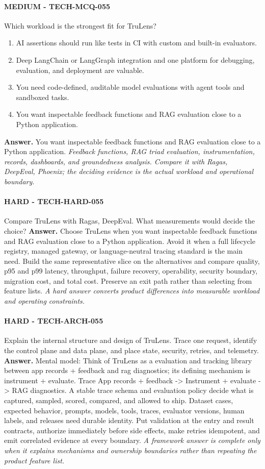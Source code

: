 \paragraph{MEDIUM - TECH-MCQ-055} Which workload is the strongest fit for TruLens?
\begin{enumerate}[label=\Alph*.]
\item AI assertions should run like tests in CI with custom and built-in evaluators.
\item Deep LangChain or LangGraph integration and one platform for debugging, evaluation, and deployment are valuable.
\item You need code-defined, auditable model evaluations with agent tools and sandboxed tasks.
\item You want inspectable feedback functions and RAG evaluation close to a Python application.
\end{enumerate}
\textbf{Answer.} You want inspectable feedback functions and RAG evaluation close to a Python application.
\textit{Feedback functions, RAG triad evaluation, instrumentation, records, dashboards, and groundedness analysis. Compare it with Ragas, DeepEval, Phoenix; the deciding evidence is the actual workload and operational boundary.}
\paragraph{HARD - TECH-HARD-055} Compare TruLens with Ragas, DeepEval. What measurements would decide the choice?
\textbf{Answer.} Choose TruLens when you want inspectable feedback functions and RAG evaluation close to a Python application. Avoid it when a full lifecycle registry, managed gateway, or language-neutral tracing standard is the main need. Build the same representative slice on the alternatives and compare quality, p95 and p99 latency, throughput, failure recovery, operability, security boundary, migration cost, and total cost. Preserve an exit path rather than selecting from feature lists.
\textit{A hard answer converts product differences into measurable workload and operating constraints.}
\paragraph{HARD - TECH-ARCH-055} Explain the internal structure and design of TruLens. Trace one request, identify the control plane and data plane, and place state, security, retries, and telemetry.
\textbf{Answer.} Mental model: Think of TruLens as a evaluation and tracking library between app records + feedback and rag diagnostics; its defining mechanism is instrument + evaluate. Trace App records + feedback -> Instrument + evaluate -> RAG diagnostics. A stable trace schema and evaluation policy decide what is captured, sampled, scored, compared, and allowed to ship. Dataset cases, expected behavior, prompts, models, tools, traces, evaluator versions, human labels, and releases need durable identity. Put validation at the entry and result contracts, authorize immediately before side effects, make retries idempotent, and emit correlated evidence at every boundary.
\textit{A framework answer is complete only when it explains mechanisms and ownership boundaries rather than repeating the product feature list.}
